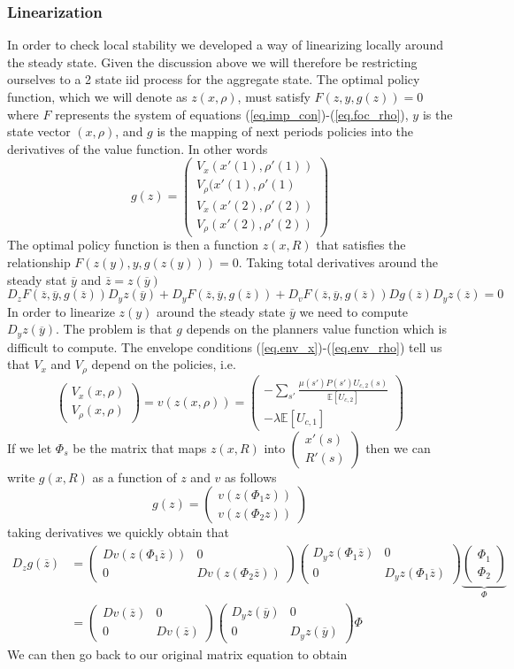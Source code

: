 \documentclass[thmsb,11pt]{article}
\newcommand{\bmat}{\begin{matrix}}
\newcommand{\emat}{\end{matrix}}
\newcommand{\ov}{\overline}
\begin{document}
\subsubsection{Linearization}  In order to check local stability we developed a way of linearizing locally around the steady state.  Given the discussion above we will therefore be restricting ourselves to a 2 state iid process for the aggregate state.  The optimal policy function, which we will denote as $z(x,\rho)$, must satisfy $F(z,y,g(z)) = 0$ where $F$ represents the system of equations (\ref{eq.imp_con})-(\ref{eq.foc_rho}), $y$ is the state vector $(x,\rho)$, and $g$ is the mapping of next periods policies into the derivatives of the value function.  In other words
\[
	g(z) = \left(\bmat V_x(x'(1),\rho'(1))\\ V_\rho(x'(1),\rho'(1)\\ V_x(x'(2),\rho'(2))\\ V_\rho(x'(2),\rho'(2))\emat\right)
\]The optimal policy function is then a function $z(x,R)$ that satisfies the relationship $F(z(y),y,g(z(y))) = 0$.  Taking total derivatives around the steady stat $\ov y$ and $\ov z = z(\ov y)$
\[
	D_zF(\ov z,\ov y, g(\ov z))D_yz(\ov y)+D_yF(\ov z, \ov y, g(\ov z)) + D_v F(\ov z, \ov y, g(\ov z)) D g(\ov z) D_y z(\ov z) = 0
\]  In order to linearize $z(y)$ around the steady state $\ov y$ we need to compute $D_y z(\ov y)$.  The problem is that $g$ depends on the planners value function which is difficult to compute.  The envelope conditions (\ref{eq.env_x})-(\ref{eq.env_rho}) tell us that $V_x$ and $V_\rho$ depend on the policies, i.e.
\[
	\left(\bmat V_x(x,\rho)\\ V_\rho(x,\rho)\emat\right) = v( z(x,\rho) ) =  \left(\bmat -\sum_{s'}\frac{\mu(s') P(s')U_{c,2}(s)}{\mathbb E\left[U_{c,2}\right]}\\ -\lambda \mathbb E\left[U_{c,1}\right]\emat\right)
\]  If we let $\Phi_s$ be the matrix that maps $z(x,R)$ into $\left(\bmat x'(s)\\ R'(s)\emat\right)$ then we can write $g(x,R)$ as a function of $z$ and $v$ as follows
\[
	g(z) = \left(\bmat v(z(\Phi_1 z))\\ v(z(\Phi_2 z))\emat\right)
\]taking derivatives we quickly obtain that
\begin{align*}
	D_z g(\ov z) &= \left(\bmat D v(z(\Phi_1 \ov z)) & 0 \\ 0&  D v(z(\Phi_2 \ov z))\emat\right)\left(\bmat D_y z(\Phi_1 \ov z) & 0\\ 0& D_y z(\Phi_1\ov z)\emat\right) \underbrace{\left(\bmat \Phi_1\\ \Phi_2\emat\right)}_{\Phi}\\
	&=\left(\bmat Dv(\ov z) &0\\0& D v(\ov z)\emat\right)\left(\bmat D_y z(\ov y) &0\\0&D_y z(\ov y)\emat\right)\Phi
\end{align*}  We can then go back to our original matrix equation to obtain
\end{document}

